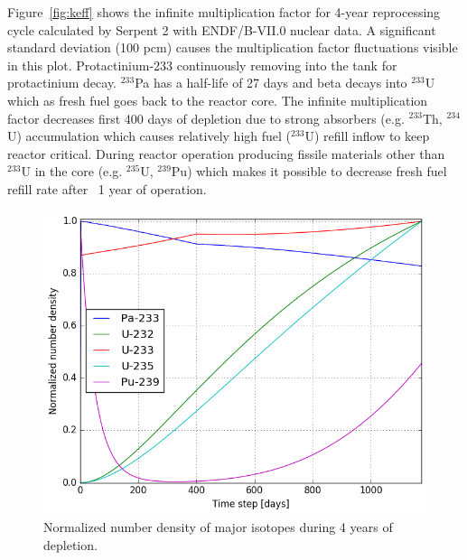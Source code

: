 \documentclass{anstrans}
\begin{document}
\FloatBarrier

Figure~\ref{fig:keff} shows the infinite multiplication factor for 4-year 
reprocessing cycle calculated by Serpent 2 with ENDF/B-VII.0 nuclear data. A 
significant standard deviation (100 pcm) causes the multiplication factor 
fluctuations visible in this plot.  Protactinium-233 continuously removing into 
the tank for protactinium decay.  $^{233}$Pa has a half-life of 27 days and 
beta decays into $^{233}$U which as fresh fuel goes back to the reactor core. 
The infinite multiplication factor decreases first 400 days of depletion due to 
strong absorbers (e.g. $^{233}$Th, $^{234}$U) accumulation which causes 
relatively high fuel ($^{233}$U) refill inflow to keep reactor critical. During 
reactor operation producing fissile materials other than $^{233}$U in the core 
(e.g. $^{235}$U, $^{239}$Pu) which makes it possible to decrease fresh fuel 
refill rate after ~1 year of operation.

\begin{figure}[htbp!] %
        \centering
        \includegraphics[width=1.03\linewidth]{fuel_composition.png}
        \caption{Normalized number density of major isotopes during 4 years of 
        depletion.}
        \label{fig:compos}
\end{figure}

\FloatBarrier
\end{document}
